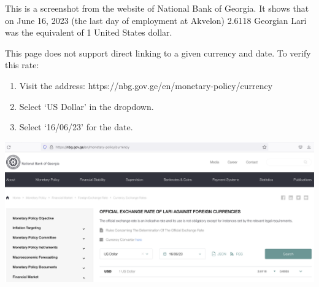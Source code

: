 
This is a screenshot from the website of National Bank of Georgia.
It shows that on June 16, 2023 (the last day of \mrls employment at Akvelon)
2.6118 Georgian Lari was the equivalent of 1 United States dollar.

This page does not support direct linking to a given currency and date.
To verify this rate:

\begin{enumerate}
    \item Visit the address: https://nbg.gov.ge/en/monetary-policy/currency
    \item Select `US Dollar' in the dropdown.
    \item Select `16/06/23' for the date.
\end{enumerate}

\includegraphics[width=\textwidth]{currency-rate}

\pagebreak
